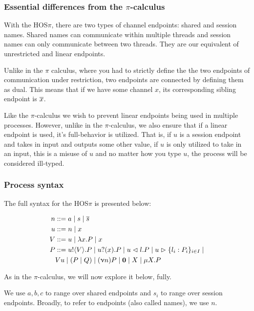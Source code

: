 \subsubsection{Essential differences from the $\pi$-calculus}

With the HOS$\pi$, there are two types of channel endpoints: shared and session names. Shared names can communicate within multiple threads and session names can only communicate between two threads. They are our equivalent of unrestricted and linear endpoints.

Unlike in the $\pi$ calculus, where you had to strictly define the the two endpoints of communication under restriction, two endpoints are connected by defining them as dual. This means that if we have some channel $x$, its corresponding sibling endpoint is $\overline{x}$.

Like the $\pi$-calculus we wish to prevent linear endpoints being used in multiple processes. However, unlike in the $\pi$-calculus, we also ensure that if a linear endpoint is used, it's full-behavior is utilized. That is, if $u$ is a session endpoint and takes in input and outputs some other value, if $u$ is only utilized to take in an input, this is a misuse of $u$ and no matter how you type $u$, the process will be considered ill-typed.

\subsubsection{Process syntax}

The full syntax for the HOS$\pi$ is presented below:

\begin{align*}
n &::= a \mid s \mid \overline{s} \\
u &::= n \mid x\\
V &::= u \mid \lambda x . P \mid x \\
P &::= u!\langle V \rangle . P \mid u ?(x) . P \mid u \vartriangleleft l . P \mid u \vartriangleright \{l_i : P_i\}_{i \in I} \mid \\
& V u \mid (P \mid Q) \mid (\upnu n) P \mid \textbf{0} \mid X \mid \mu X . P
\end{align*}

As in the $\pi$-calculus, we will now explore it below, fully.


We use $a,b,c$ to range over shared endpoints and $s_i$ to range over session endpoints. Broadly, to refer to endpoints (also called names), we use $n$.


